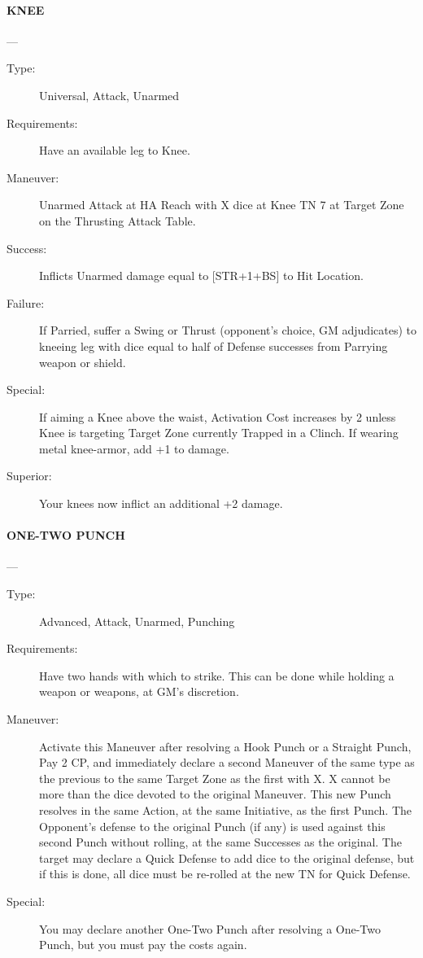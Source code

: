 \documentclass[oneside,11pt,english]{book}
\begin{document}
\paragraph{\large\label{man:KNEE} KNEE}---\quad{\large[X]}
\vspace{-10pt}\begin{description} 
\item [Type:] Universal, Attack, Unarmed 
\item [Requirements:] Have an available leg to Knee. 
\item [Maneuver:] Unarmed Attack at HA Reach with X dice at Knee TN 7 at Target Zone on the Thrusting 
Attack Table. 
\item [Success:] Inflicts Unarmed damage equal to [STR+1+BS] to Hit Location. 
\item [Failure:] If Parried, suffer a Swing or Thrust (opponent’s choice, GM adjudicates) to kneeing leg with 
dice equal to half of Defense successes from Parrying weapon or shield. 
\item [Special:] If aiming a Knee above the waist, Activation Cost increases by 2 unless Knee is targeting Target 
Zone currently Trapped in a Clinch. If wearing metal knee-armor, add +1 to damage. 
\item [Superior:] Your knees now inflict an additional +2 damage. 
\end{description}

\paragraph{\large\label{man:ONE-TWO PUNCH} ONE-TWO PUNCH}---\quad{\large[X+2]}
\vspace{-10pt}\begin{description} 
\item [Type:] Advanced, Attack, Unarmed, Punching 
\item [Requirements:] Have two hands with which to strike. This can be done while holding a weapon or 
weapons, at GM’s discretion. 
\item [Maneuver:] Activate this Maneuver after resolving a Hook Punch or a Straight Punch, Pay 2 CP, and 
immediately declare a second Maneuver of the same type as the previous to the same Target Zone as the 
first with X. X cannot be more than the dice devoted to the original Maneuver. This new Punch resolves 
in the same Action, at the same Initiative, as the first Punch. The Opponent’s defense to the original 
Punch (if any) is used against this second Punch without rolling, at the same Successes as the original. 
The target may declare a Quick Defense to add dice to the original defense, but if this is done, all dice 
must be re-rolled at the new TN for Quick Defense. 
\item [Special:] You may declare another One-Two Punch after resolving a One-Two Punch, but you must pay 
the costs again. 
\end{description}
 
\end{document}
